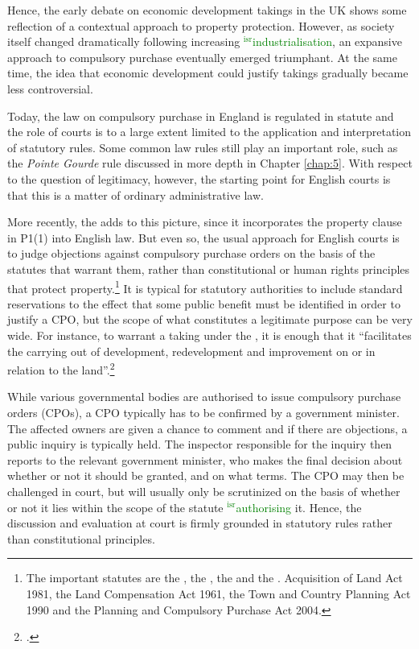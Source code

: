 \documentclass[12pt,a4paper]{book} %
\newcommand{\isr}[1]{\textcolor{green}{$^{\textrm{isr}}${#1}}}
\begin{document}
Hence, the early debate on economic development takings in the UK shows some reflection of a contextual approach to property protection. However, as society itself changed dramatically following increasing \isr{industrialisation}, an expansive approach to compulsory purchase eventually emerged triumphant. At the same time, the idea that economic development could justify takings gradually became less controversial. 

Today, the law on compulsory purchase in England is regulated in statute and the role of courts is to a large extent limited to the application and interpretation of statutory rules. Some common law rules still play an important role, such as the {\it Pointe Gourde} rule discussed in more depth in Chapter \ref{chap:5}. With respect to the question of legitimacy, however, the starting point for English courts is that this is a matter of ordinary administrative law. 

More recently, the \cite{hra98} adds to this picture, since it incorporates the property clause in P1(1) into English law. But even so, the usual approach for English courts is to judge objections against compulsory purchase orders on the basis of the statutes that warrant them, rather than constitutional or human rights principles that protect property.\footnote{The important statutes are the \cite{ala81}, the \cite{lca61}, the \cite{tcpa90} and the \cite{pcpa04}. Acquisition of Land Act 1981, the Land Compensation Act 1961, the Town and Country Planning Act 1990 and the Planning and Compulsory Purchase Act 2004.} It is typical for statutory authorities to include standard reservations to the effect that some public benefit must be identified in order to justify a CPO, but the scope of what constitutes a legitimate purpose can be very wide. For instance, to warrant a taking under the \cite{tcpa90}, it is enough that it ``facilitates the carrying out of development, redevelopment and improvement on or in relation to the land''.\footcite[226]{tcpa90} 

While various governmental bodies are authorised to issue compulsory purchase orders (CPOs), a CPO typically has to be confirmed by a government minister. The affected owners are given a chance to comment and if there are objections, a public inquiry is typically held. The inspector responsible for the inquiry then reports to the relevant government minister, who makes the final decision about whether or not it should be granted, and on what terms. The CPO may then be challenged in court, but will usually only be scrutinized on the basis of whether or not it lies within the scope of the statute \isr{authorising} it. Hence, the discussion and evaluation at court is firmly grounded in statutory rules rather than constitutional principles.
\end{document}

